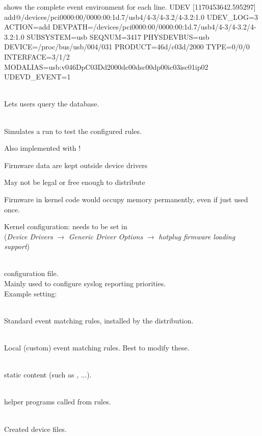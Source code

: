  shows the complete event environment for each line.
\starttyping
UDEV [1170453642.595297] add@/devices/pci0000:00/0000:00:1d.7/usb4/4-3/4-3.2/4-3.2:1.0
UDEV_LOG=3
ACTION=add
DEVPATH=/devices/pci0000:00/0000:00:1d.7/usb4/4-3/4-3.2/4-3.2:1.0
SUBSYSTEM=usb
SEQNUM=3417
PHYSDEVBUS=usb
DEVICE=/proc/bus/usb/004/031
PRODUCT=46d/c03d/2000
TYPE=0/0/0
INTERFACE=3/1/2
MODALIAS=usb:v046DpC03Dd2000dc00dsc00dp00ic03isc01ip02
UDEVD_EVENT=1
\stoptyping

  \startitemize
  \item {}\\
    Lets users query the  database.
  \item {} \\
    Simulates a  run to test the configured rules.
  \stopitemize

  Also implemented with !
  \startitemize
  \item Firmware data are kept outside device drivers
    \startitemize
    \item May not be legal or free enough to distribute
    \item Firmware in kernel code would occupy memory permanently,
      even if just used once.
    \stopitemize
  \item Kernel configuration: needs to be set in \\
    ({\em Device Drivers} $\rightarrow$ {\em Generic Driver Options}
    $\rightarrow$ {\em hotplug firmware loading support})
  \stopitemize


  \startitemize
  \item {}\\
     configuration file.\\
    Mainly used to configure syslog reporting priorities.\\
    Example setting: 
  \item {}\\
    Standard  event matching rules, installed by the distribution.
  \item {}\\
    Local (custom)  event matching rules. Best to modify these.
  \item {}\\
    static  content (such as ,
    ...).
  \item {}\\
    helper programs called from  rules.
  \item {}\\
    Created device files.
  \stopitemize

